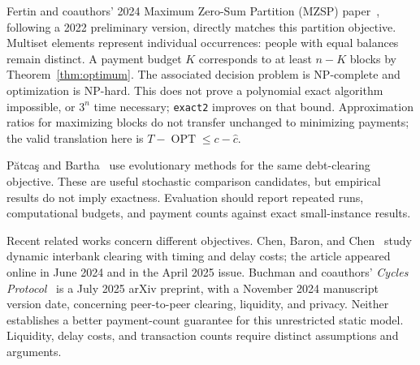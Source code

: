 \documentclass[11pt]{article}
\begin{document}
Fertin and coauthors' 2024 Maximum Zero-Sum Partition (MZSP)
paper~\cite{fertin2024}, following a 2022 preliminary version, directly
matches this partition objective. Multiset elements represent individual
occurrences: people with equal balances remain distinct. A payment budget
$K$ corresponds to at least $n-K$ blocks by Theorem~\ref{thm:optimum}.
The associated decision problem is NP-complete and optimization is
NP-hard. This does not prove a polynomial exact algorithm impossible,
or $3^n$ time necessary; \texttt{exact2} improves on that bound.
Approximation ratios for maximizing blocks do not transfer unchanged to
minimizing payments; the valid translation here is
$T-\operatorname{OPT}\leq c-\hat c$.

P\u{a}tca\c{s} and Bartha~\cite{patcas2019} use evolutionary methods for
the same debt-clearing objective. These are useful stochastic comparison
candidates, but empirical results do not imply exactness. Evaluation
should report repeated runs, computational budgets, and payment counts
against exact small-instance results.

Recent related works concern different objectives. Chen, Baron, and
Chen~\cite{chen2025} study dynamic interbank clearing with timing and
delay costs; the article appeared online in June 2024 and in the April
2025 issue. Buchman and coauthors' \emph{Cycles Protocol}~\cite{buchman2025}
is a July 2025 arXiv preprint, with a November 2024 manuscript version
date, concerning peer-to-peer clearing, liquidity, and privacy. Neither
establishes a better payment-count guarantee for this unrestricted static
model. Liquidity, delay costs, and transaction counts require distinct
assumptions and arguments.
\end{document}
